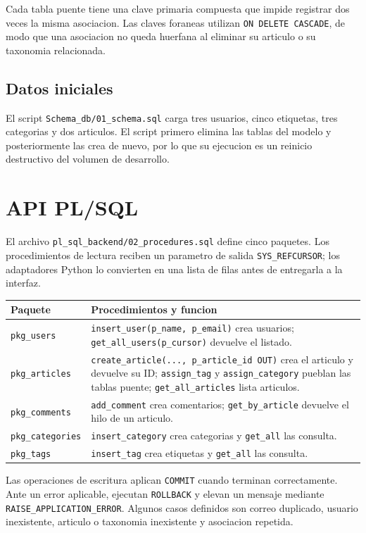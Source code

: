 \documentclass[12pt,a4paper]{article}
\begin{document}
Cada tabla puente tiene una clave primaria compuesta que impide registrar dos
veces la misma asociacion. Las claves foraneas utilizan \texttt{ON DELETE
CASCADE}, de modo que una asociacion no queda huerfana al eliminar su articulo
o su taxonomia relacionada.

\subsection{Datos iniciales}

El script \texttt{Schema\_db/01\_schema.sql} carga tres usuarios, cinco
etiquetas, tres categorias y dos articulos. El script primero elimina las
tablas del modelo y posteriormente las crea de nuevo, por lo que su ejecucion
es un reinicio destructivo del volumen de desarrollo.

\section{API PL/SQL}

El archivo \texttt{pl\_sql\_backend/02\_procedures.sql} define cinco paquetes.
Los procedimientos de lectura reciben un parametro de salida
\texttt{SYS\_REFCURSOR}; los adaptadores Python lo convierten en una lista de
filas antes de entregarla a la interfaz.

\begin{longtable}{p{}p{}}
\toprule
\textbf{Paquete} & \textbf{Procedimientos y funcion} \\
\midrule
\texttt{pkg\_users} & \texttt{insert\_user(p\_name, p\_email)} crea usuarios; \texttt{get\_all\_users(p\_cursor)} devuelve el listado. \\
\texttt{pkg\_articles} & \texttt{create\_article(..., p\_article\_id OUT)} crea el articulo y devuelve su ID; \texttt{assign\_tag} y \texttt{assign\_category} pueblan las tablas puente; \texttt{get\_all\_articles} lista articulos. \\
\texttt{pkg\_comments} & \texttt{add\_comment} crea comentarios; \texttt{get\_by\_article} devuelve el hilo de un articulo. \\
\texttt{pkg\_categories} & \texttt{insert\_category} crea categorias y \texttt{get\_all} las consulta. \\
\texttt{pkg\_tags} & \texttt{insert\_tag} crea etiquetas y \texttt{get\_all} las consulta. \\
\bottomrule
\end{longtable}

Las operaciones de escritura aplican \texttt{COMMIT} cuando terminan
correctamente. Ante un error aplicable, ejecutan \texttt{ROLLBACK} y elevan un
mensaje mediante \texttt{RAISE\_APPLICATION\_ERROR}. Algunos casos definidos
son correo duplicado, usuario inexistente, articulo o taxonomia inexistente y
asociacion repetida.
\end{document}
